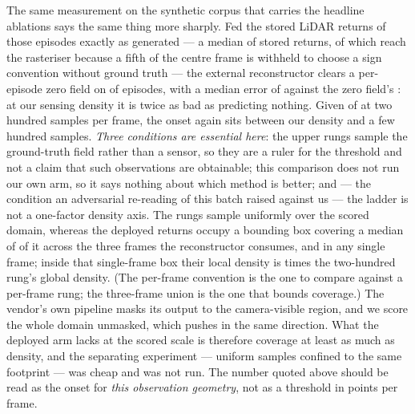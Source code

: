 \documentclass[review]{elsarticle}
\begin{document}
The same measurement on the synthetic corpus that carries the headline ablations says
the same thing more sharply. Fed the stored LiDAR returns of those episodes exactly as
generated --- a median of \ETwoObs{} stored returns, of which \ETwoObsFed{} reach the
rasteriser because a fifth of the centre frame is withheld to choose a sign convention
without ground truth --- the
external reconstructor clears a per-episode zero field on \ETwoDeployBetter{} of
\ETwoN{} episodes, with a median error of \ETwoDeployMed{} against the zero field's
\ETwoZeroMed{}: at our sensing density it is twice as bad as predicting nothing. Given
\ETwoRungTwoHundred{} of \ETwoN{} at two hundred samples per frame, the onset again sits
between our density and a few hundred samples. \emph{Three conditions are essential
here}: the upper rungs sample the ground-truth field rather than a sensor, so they are a
ruler for the threshold and not a claim that such observations are obtainable; this
comparison does not run our own arm, so it says nothing about which method is better;
and --- the condition an adversarial re-reading of this batch raised against us --- the
ladder is not a one-factor density axis. The rungs sample uniformly over the scored
domain, whereas the deployed returns occupy a bounding box covering a median of
\ETwoFootprintPctThree{} of it across the three frames the reconstructor consumes,
and \ETwoFootprintPct{} in any single frame; inside that single-frame box their local
density is \ETwoFootprintRatio{} times the two-hundred rung's global density. (The
per-frame convention is the one to compare against a per-frame rung; the three-frame
union is the one that bounds coverage.) The vendor's own pipeline masks its output to
the camera-visible region, and we score the whole domain unmasked, which pushes in the
same direction. What the deployed arm lacks at the scored
scale is therefore coverage at least as much as density, and the separating experiment
--- uniform samples confined to the same footprint --- was cheap and was not run. The
number quoted above should be read as the onset for \emph{this observation geometry},
not as a threshold in points per frame.
\end{document}
